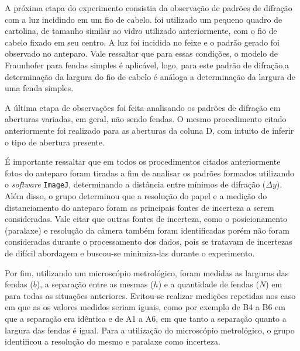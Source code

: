 A próxima etapa do experimento consistia da observação de padrões de difração com a luz incidindo em um fio de cabelo. foi utilizado um pequeno quadro de cartolina, de tamanho similar ao vidro utilizado anteriormente, com o fio de cabelo fixado em seu centro. A luz foi incidida no feixe e o padrão gerado foi observado no anteparo. Vale ressaltar que para essas condições, o modelo de Fraunhofer para fendas simples é aplicável, logo, para este padrão de difração,a determinação da largura do fio de cabelo é análoga a determinação da largura de uma fenda simples.

A última etapa de observações foi feita analisando os padrões de difração em aberturas variadas, em geral, não sendo fendas. O mesmo procedimento citado anteriormente foi realizado para as aberturas da coluna D, com intuito de inferir o tipo de abertura presente.

É importante ressaltar que em todos os procedimentos citados anteriormente fotos do anteparo foram tiradas a fim de analisar os padrões formados utilizando o \textit{software} \texttt{ImageJ}, determinando a distância entre mínimos de difração ($\Delta y$). Além disso, o grupo determinou que a resolução do papel e a medição do distanciamento do anteparo foram as principais fontes de incerteza a serem consideradas. Vale citar que outras fontes de incerteza, como o posicionamento (paralaxe) e resolução da câmera também foram identificadas porém não foram consideradas durante o processamento dos dados, pois se tratavam de incertezas de difícil abordagem e buscou-se minimiza-las durante o experimento.

Por fim, utilizando um microscópio metrológico, foram medidas as larguras das fendas ($b$), a separação entre as mesmas ($h$) e a quantidade de fendas ($N$) em para todas as situações anteriores. Evitou-se realizar medições repetidas nos caso em que as os valores medidos seriam iguais, como por exemplo de B4 a B6 em que a separação era idêntica e de A1 a A6, em que tanto a separação quanto a largura das fendas é igual. Para a utilização do microscópio metrológico, o grupo identificou a resolução do mesmo e paralaxe como incerteza.  


